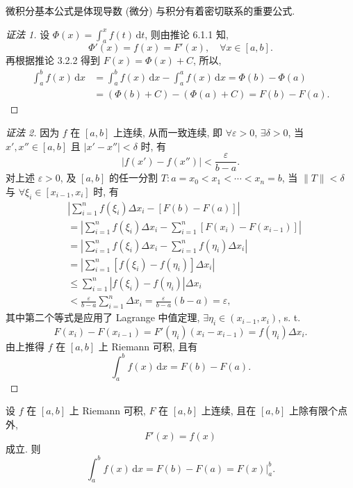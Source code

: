 微积分基本公式是体现导数 (微分) 与积分有着密切联系的重要公式.

\begin{proof}[证法 1]
设 $\Phi(x)=\int_{a}^{x}f(t)\,\mathrm{d}t$, 则由推论 6.1.1 知,
\[
\Phi'(x)=f(x)=F'(x),\quad \forall x\in[a,b].
\]
再根据推论 3.2.2 得到 $F(x)=\Phi(x)+C$, 所以,
\[
\begin{aligned}
\int_{a}^{b}f(x)\,\mathrm{d}x&=\int_{a}^{b}f(x)\,\mathrm{d}x-\int_{a}^{a}f(x)\,\mathrm{d}x=\Phi(b)-\Phi(a)\\
&=(\Phi(b)+C)-(\Phi(a)+C)=F(b)-F(a).
\end{aligned}
\]
\end{proof}

\begin{proof}[证法 2]
因为 $f$ 在 $[a,b]$ 上连续, 从而一致连续, 即 $\forall\varepsilon>0$, $\exists\delta>0$, 当 $x',x''\in[a,b]$ 且 $|x'-x''|<\delta$ 时, 有
\[
|f(x')-f(x'')|<\frac{\varepsilon}{b-a}.
\]
对上述 $\varepsilon>0$, 及 $[a,b]$ 的任一分割 $T:a=x_{0}<x_{1}<\cdots<x_{n}=b$, 当 $\|T\|<\delta$ 与 $\forall\xi_{i}\in[x_{i-1},x_{i}]$ 时, 有
\begin{align*}
&\left|\sum_{i=1}^{n}f(\xi_{i})\Delta x_{i}-[F(b)-F(a)]\right|\\
&=\left|\sum_{i=1}^{n}f(\xi_{i})\Delta x_{i}-\sum_{i=1}^{n}[F(x_{i})-F(x_{i-1})]\right|\\
&=\left|\sum_{i=1}^{n}f(\xi_{i})\Delta x_{i}-\sum_{i=1}^{n}f(\eta_{i})\Delta x_{i}\right|\\
&=\left|\sum_{i=1}^{n}[f(\xi_{i})-f(\eta_{i})]\Delta x_{i}\right|\\
&\leqslant\sum_{i=1}^{n}|f(\xi_{i})-f(\eta_{i})|\Delta x_{i}\\
&<\frac{\varepsilon}{b-a}\sum_{i=1}^{n}\Delta x_{i}=\frac{\varepsilon}{b-a}(b-a)=\varepsilon,
\end{align*}
其中第二个等式是应用了 Lagrange 中值定理, $\exists\eta_{i}\in(x_{i-1},x_{i})$, s. t.
\[
F(x_{i})-F(x_{i-1})=F'(\eta_{i})(x_{i}-x_{i-1})=f(\eta_{i})\Delta x_{i}.
\]
由上推得 $f$ 在 $[a,b]$ 上 Riemann 可积, 且有
\[
\int_{a}^{b}f(x)\,\mathrm{d}x=F(b)-F(a).
\]
\end{proof}

\begin{theorem}\label{thm:6.3.4}
设 $f$ 在 $[a,b]$ 上 Riemann 可积, $F$ 在 $[a,b]$ 上连续, 且在 $[a,b]$ 上除有限个点外,
\[
F'(x)=f(x)
\]
成立. 则
\[
\int_{a}^{b}f(x)\,\mathrm{d}x=F(b)-F(a)=F(x)\Big|_{a}^{b}.
\]
\end{theorem}

